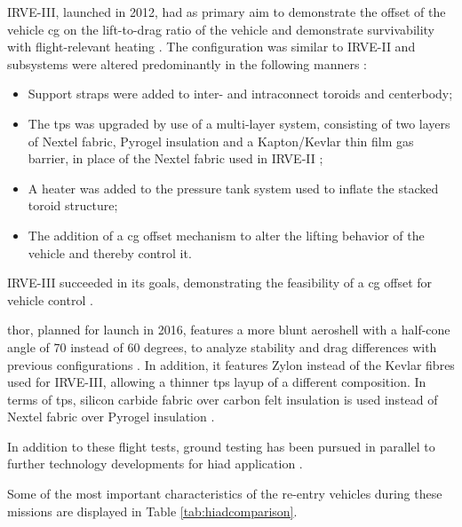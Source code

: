 IRVE-III, launched in 2012, had as primary aim to demonstrate the offset of the vehicle \gls{cg} on the lift-to-drag ratio of the vehicle and demonstrate survivability with flight-relevant heating \cite{Dillman2012a}. The configuration was similar to IRVE-II and subsystems were altered predominantly in the following  manners \cite{Dillman2012a}:
\begin{itemize}
\item Support straps were added to inter- and intraconnect toroids and centerbody;
\item The \acrfull{tps} was upgraded by use of a multi-layer system, consisting of two layers of Nextel fabric, Pyrogel insulation and a Kapton/Kevlar thin film gas barrier, in place of the Nextel fabric used in IRVE-II \cite{Dillman2012}; 
\item A heater was added to the pressure tank system used to inflate the stacked toroid structure;
\item The addition of a \gls{cg} offset mechanism to alter the lifting behavior of the vehicle and thereby control it.
\end{itemize}
IRVE-III succeeded in its goals, demonstrating the feasibility of a \gls{cg} offset for vehicle control \cite{Dillman2012}.

\gls{thor}, planned for launch in 2016, features a more blunt aeroshell with a half-cone angle of 70 instead of 60 degrees, to analyze stability and drag differences with previous configurations \cite{Hughes2005, Dillman2010, Dillman2012, Dillman2014}. In addition, it features Zylon instead of the Kevlar fibres used for IRVE-III, allowing a thinner \gls{tps} layup of a different composition. In terms of \gls{tps}, silicon carbide fabric over carbon felt insulation is used instead of Nextel fabric over Pyrogel insulation \cite{Dillman2014}.

In addition to these flight tests, ground testing has been pursued in parallel to further technology developments for \gls{hiad} application \cite{Smith2010}.

Some of the most important characteristics of the re-entry vehicles during these missions are displayed in Table \ref{tab:hiadcomparison}.


